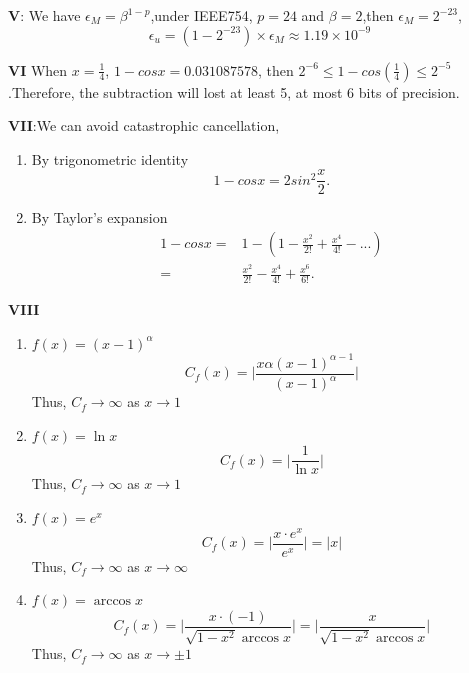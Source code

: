\documentclass{article}
\begin{document}
\textbf{V}: We have $\epsilon_M = \beta^{1-p} $,under IEEE754, $p=24$ and $ \beta = 2$,then $\epsilon_M = 2^{-23}$,
\begin{equation*}
    \epsilon_u = (1-2^{-23})\times \epsilon_M \approx 1.19 \times 10^{-9}
\end{equation*} 

\textbf{VI}
When $x = \frac{1}{4}$, $1-cosx = 0.031087578$, then $2^{-6} \leq 1 - cos(\frac{1}{4}) \leq 2^{-5}$.Therefore, the subtraction will lost at least 5, at most 6 bits of precision.

\textbf{VII}:We can avoid catastrophic cancellation,
\begin{enumerate}
    \item By trigonometric identity 
        \begin{equation*}
            1 - cos x = 2sin^2\frac{x}{2}.
        \end{equation*}
    \item By Taylor's expansion
        \begin{align*}
            1 - cos x =& 1-(1-\frac{x^2}{2!}+\frac{x^4}{4!}-...) \\
            =& \frac{x^2}{2!}-\frac{x^4}{4!} + \frac{x^6}{6!}.
        \end{align*}
\end{enumerate}

\textbf{VIII}
\begin{enumerate}
    \item $f(x) = (x-1)^{\alpha}$
        \begin{equation*}
            C_f(x) = \lvert \frac{x\alpha (x-1)^{\alpha -1}}{(x-1)^{\alpha}} \rvert
        \end{equation*}
    Thus, $C_f \rightarrow \infty$ as $ x \rightarrow 1$
    \item $f(x) = \ln x$
        \begin{equation*}
            C_f(x) = \lvert \frac{1}{\ln x} \rvert
        \end{equation*}
    Thus, $C_f \rightarrow \infty$ as $ x \rightarrow 1$
    \item $f(x) = e^x$
        \begin{equation*}
            C_f(x) = \lvert \frac{x \cdot e^x}{e^x} \rvert = \lvert x \rvert
        \end{equation*}
    Thus, $C_f \rightarrow \infty$ as $ x \rightarrow \infty$
    \item $f(x) = \arccos{x}$
        \begin{equation*}
            C_f(x) = \lvert \frac{x \cdot (-1)}{\sqrt{1-x^2} \arccos{x}} \rvert = \lvert \frac{x}{\sqrt{1-x^2} \arccos{x}} \rvert
        \end{equation*}
    Thus, $C_f \rightarrow \infty$ as $ x \rightarrow \pm 1$
\end{enumerate}
\end{document}
